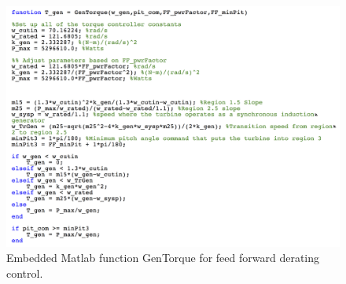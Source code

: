  \begin{figure}[ht]
	\centering
		\includegraphics[width=\linewidth]{Figures/AppendixBFigures/FF_Derate9.png}
	\caption{Embedded Matlab function GenTorque for feed forward derating control.}
	\label{figB-15}
\end{figure}
